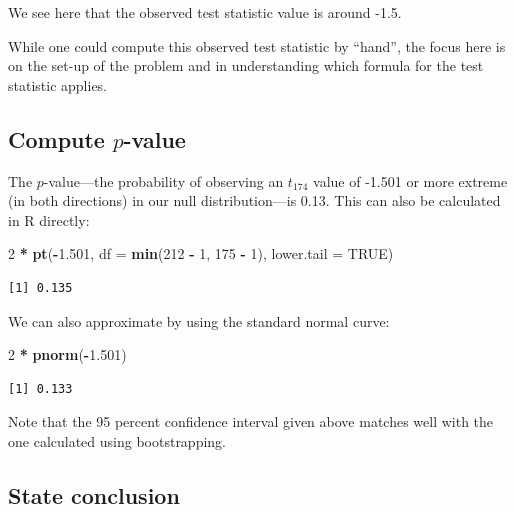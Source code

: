 \documentclass[12pt,]{krantz}
\makeatletter
\newenvironment{Shaded}{\begin{snugshade}}{\end{snugshade}}
\newcommand{\KeywordTok}[1]{\textcolor[rgb]{0.27,0.27,0.27}{\textbf{#1}}}
\newcommand{\DataTypeTok}[1]{\textcolor[rgb]{0.27,0.27,0.27}{#1}}
\newcommand{\DecValTok}[1]{\textcolor[rgb]{0.06,0.06,0.06}{#1}}
\newcommand{\FloatTok}[1]{\textcolor[rgb]{0.06,0.06,0.06}{#1}}
\newcommand{\StringTok}[1]{\textcolor[rgb]{0.5,0.5,0.5}{#1}}
\newcommand{\OtherTok}[1]{\textcolor[rgb]{0.37,0.37,0.37}{#1}}
\newcommand{\OperatorTok}[1]{\textcolor[rgb]{0.43,0.43,0.43}{\textbf{#1}}}
\newcommand{\NormalTok}[1]{#1}
\newenvironment{kframe}{%
\medskip{}
\setlength{\fboxsep}{.8em}
 \def\at@end@of@kframe{}%
 \ifinner\ifhmode%
  \def\at@end@of@kframe{\end{minipage}}%
  \begin{minipage}{\columnwidth}%
 \fi\fi%
 \def\FrameCommand##1{\hskip\@totalleftmargin \hskip-\fboxsep
 \colorbox{shadecolor}{##1}\hskip-\fboxsep
     \hskip-\linewidth \hskip-\@totalleftmargin \hskip\columnwidth}%
 \MakeFramed {\advance\hsize-\width
   \@totalleftmargin\z@ \linewidth\hsize
   \@setminipage}}%
 {\par\unskip\endMakeFramed%
 \at@end@of@kframe}
\renewenvironment{Shaded}{\begin{kframe}}{\end{kframe}}
\makeatother
\begin{document}
We see here that the observed test statistic value is around -1.5.

While one could compute this observed test statistic by ``hand'', the
focus here is on the set-up of the problem and in understanding which
formula for the test statistic applies.

\subsection{\texorpdfstring{Compute
\(p\)-value}{Compute p-value}}\label{compute-p-value-1}

The \(p\)-value---the probability of observing an \(t_{174}\) value of
-1.501 or more extreme (in both directions) in our null
distribution---is 0.13. This can also be calculated in R directly:

\begin{Shaded}
\begin{Highlighting}[]
\DecValTok{2} \OperatorTok{*}\StringTok{ }\KeywordTok{pt}\NormalTok{(}\OperatorTok{-}\FloatTok{1.501}\NormalTok{, }\DataTypeTok{df =} \KeywordTok{min}\NormalTok{(}\DecValTok{212} \OperatorTok{-}\StringTok{ }\DecValTok{1}\NormalTok{, }\DecValTok{175} \OperatorTok{-}\StringTok{ }\DecValTok{1}\NormalTok{), }\DataTypeTok{lower.tail =} \OtherTok{TRUE}\NormalTok{)}
\end{Highlighting}
\end{Shaded}

\begin{verbatim}
[1] 0.135
\end{verbatim}

We can also approximate by using the standard normal curve:

\begin{Shaded}
\begin{Highlighting}[]
\DecValTok{2} \OperatorTok{*}\StringTok{ }\KeywordTok{pnorm}\NormalTok{(}\OperatorTok{-}\FloatTok{1.501}\NormalTok{)}
\end{Highlighting}
\end{Shaded}

\begin{verbatim}
[1] 0.133
\end{verbatim}

Note that the 95 percent confidence interval given above matches well
with the one calculated using bootstrapping.

\subsection{State conclusion}\label{state-conclusion-3}
\end{document}
